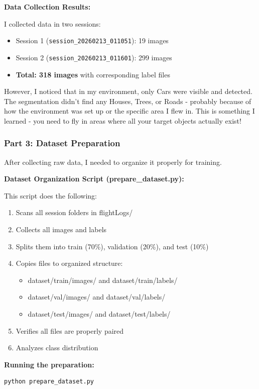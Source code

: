 \textbf{Data Collection Results:}

I collected data in two sessions:
\begin{itemize}
	\item Session 1 (\texttt{session\_20260213\_011051}): 19 images
	\item Session 2 (\texttt{session\_20260213\_011601}): 299 images
	\item \textbf{Total: 318 images} with corresponding label files
\end{itemize}

However, I noticed that in my environment, only Cars were visible and detected. The segmentation didn't find any Houses, Trees, or Roads - probably because of how the environment was set up or the specific area I flew in. This is something I learned - you need to fly in areas where all your target objects actually exist!

\clearpage

\subsubsection{Part 3: Dataset Preparation}

After collecting raw data, I needed to organize it properly for training.

\textbf{Dataset Organization Script (prepare\_dataset.py):}

This script does the following:
\begin{enumerate}
	\item Scans all session folders in flightLogs/
	\item Collects all images and labels
	\item Splits them into train (70\%), validation (20\%), and test (10\%)
	\item Copies files to organized structure:
	\begin{itemize}
		\item dataset/train/images/ and dataset/train/labels/
		\item dataset/val/images/ and dataset/val/labels/
		\item dataset/test/images/ and dataset/test/labels/
	\end{itemize}
	\item Verifies all files are properly paired
	\item Analyzes class distribution
\end{enumerate}

\textbf{Running the preparation:}
\begin{verbatim}
python prepare_dataset.py
\end{verbatim}

